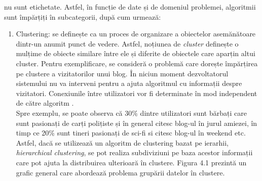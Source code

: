 \documentclass[a4paper,12pt]{report}
\begin{document}
\begin{enumerate}
    nu sunt etichetate. Astfel, în funcție de date și de domeniul problemei, algoritmii sunt împărțiți în
    subcategorii, după cum urmează:
    \begin{enumerate}
        \item Clustering: se definește ca un proces de organizare a obiectelor asemănătoare dintr-un anumit punct de vedere. Astfel, noțiunea de \emph{cluster} definește
        o mulțime de obiecte similare între ele și diferite de obiectele care aparțin altui cluster. Pentru exemplificare, 
        se consideră o problemă care dorește împărțirea pe clustere a vizitatorilor unui blog. În niciun moment
        dezvoltatorul sistemului nu va interveni pentru a ajuta algoritmul cu informații despre vizitatori. Conexiunile
        între utilizatori vor fi determinate în mod independent de către algoritm \cite{Hands-On-Machine-Learning}. \\ Spre exemplu, se poate observa
        că 30\% dintre utilizatori sunt bărbați care sunt pasionați de carți polițiste și în general citesc blog-ul
        în jurul amiezei, în timp ce 20\% sunt tineri pasionați de sci-fi si citesc blog-ul în weekend etc. Astfel,
        dacă se utilizează un algoritm de clustering bazat pe ierarhii, \emph{hierarchical clustering}, se pot realiza
        subdiviziuni pe baza acestor informații care pot ajuta la distribuirea ulterioară în clustere. 
        Figura 4.1 prezintă un grafic general care abordează problema grupării datelor în clustere.


\end{enumerate}
\end{enumerate}
\end{document}
